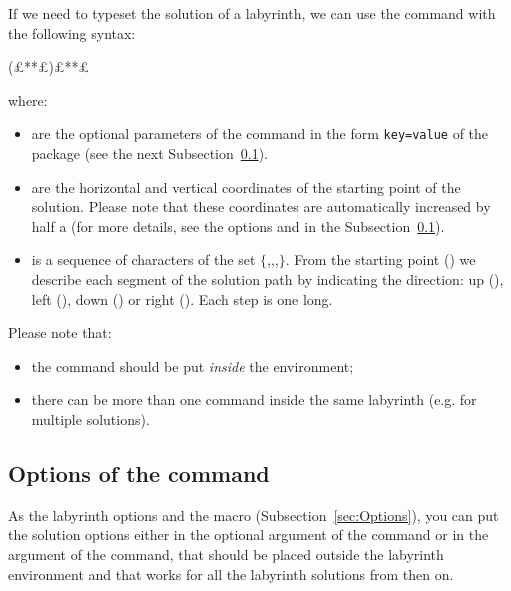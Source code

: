 \documentclass[a4paper,11pt,headinclude,footinclude]{scrartcl}
\def\ins{~}
\begin{document}
If we need to typeset the solution of a labyrinth, we can use the  command with the following syntax:
\begin{code}
(£**£){£**£}
\end{code}
where:
\begin{itemize}
\item {} are the optional parameters of the command in the form \texttt{key=value} of the  package (see the next Subsection\ins\ref{sec:KeyOptions}).

\item {} are the horizontal and vertical coordinates of the starting point of the solution. Please note that these coordinates are automatically increased by half a  (for more details, see the options  and  in the Subsection\ins\ref{sec:KeyOptions}).

\item {} is a sequence of characters of the set $\{$,,,$\}$. From the starting point () we describe each segment of the solution path by indicating the direction: up (), left (), down () or right (). Each step is one  long.

\end{itemize}
Please note that:
\begin{itemize}
\item the  command should be put \emph{inside} the  environment;
\item there can be more than one  command inside the same labyrinth (e.g. for multiple solutions).
\end{itemize}

\subsection{Options of the  command}
\label{sec:KeyOptions}

As the labyrinth options and the  macro (Subsection\ins\ref{sec:Options}), you can put the solution options either in the optional argument of the  command or in the argument of the  command, that should be placed outside the labyrinth environment and that works for all the labyrinth solutions from then on.
\begin{code}
\end{code}
\end{document}
